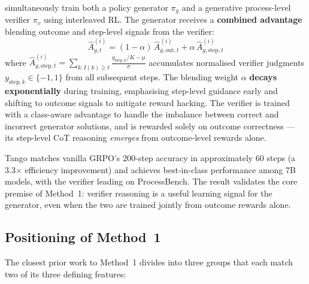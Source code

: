 \autocite{zha2025rltangoreinforcinggenerator} simultaneously train both a policy generator $\pi_g$ and a generative process-level verifier $\pi_v$ using interleaved RL. The generator receives a \textbf{combined advantage} blending outcome and step-level signals from the verifier:
\begin{equation}
    \hat{A}_{g,t}^{(i)} = (1 - \alpha)\,\hat{A}_{g,\text{out},t}^{(i)} + \alpha\,\hat{A}_{g,\text{step},t}^{(i)}
    \label{eq:rl_tango}
\end{equation}
where $\hat{A}_{g,\text{step},t}^{(i)} = \sum_{k: I(k) \geq t} \frac{y_{\text{step},k} / K - \mu}{\sigma}$ accumulates normalised verifier judgments $y_{\text{step},k} \in \{-1, 1\}$ from all subsequent steps. The blending weight $\alpha$ \textbf{decays exponentially} during training, emphasising step-level guidance early and shifting to outcome signals to mitigate reward hacking. The verifier is trained with a class-aware advantage to handle the imbalance between correct and incorrect generator solutions, and is rewarded solely on outcome correctness --- its step-level CoT reasoning \emph{emerges} from outcome-level rewards alone.

Tango matches vanilla GRPO's 200-step accuracy in approximately 60 steps (a 3.3$\times$ efficiency improvement) and achieves best-in-class performance among 7B models, with the verifier leading on ProcessBench. The result validates the core premise of Method~1: verifier reasoning is a useful learning signal for the generator, even when the two are trained jointly from outcome rewards alone.

\subsection{Positioning of Method~1}
\label{sec:positioning}

The closest prior work to Method~1 divides into three groups that each match two of its three defining features:

